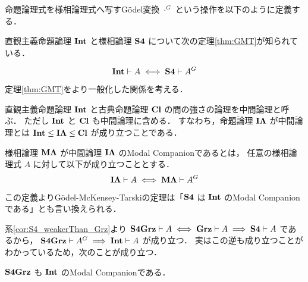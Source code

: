 \documentclass{jsarticle}
\begin{document}
\begin{definition}[Gödel変換]
	命題論理式を様相論理式へ写すGödel変換 $\cdot^G$ という操作を以下のように定義する．
\end{definition}

直観主義命題論理 $\mathbf{Int}$ と様相論理 $\mathbf{S4}$ について次の定理\ref{thm:GMT}が知られている．

\begin{theorem}\label{thm:GMT}
	\begin{equation*}
		\mathbf{Int} \vdash A \iff \mathbf{S4} \vdash A^G
	\end{equation*}
\end{theorem}

定理\ref{thm:GMT}をより一般化した関係を考える．

\begin{definition}[中間論理]
	直観主義命題論理 $\mathbf{Int}$ と古典命題論理 $\mathbf{Cl}$ の間の強さの論理を中間論理と呼ぶ．
	ただし $\mathbf{Int}$ と $\mathbf{Cl}$ も中間論理に含める．
	すなわち，命題論理 $\mathbf{I\Lambda}$ が中間論理とは $\mathbf{Int} \leq \mathbf{I\Lambda} \leq \mathbf{Cl}$ が成り立つことである．
\end{definition}

\begin{definition}
	様相論理 $\mathbf{M\Lambda}$ が中間論理 $\mathbf{I\Lambda}$ のModal Companionであるとは，
	任意の様相論理式 $A$ に対して以下が成り立つこととする．
	\begin{equation*}
		\mathbf{I\Lambda} \vdash A \iff \mathbf{M\Lambda} \vdash A^G
	\end{equation*}
\end{definition}

この定義よりGödel-McKensey-Tarskiの定理は「$\mathbf{S4}$ は $\mathbf{Int}$ のModal Companionである」とも言い換えられる．


系\ref{cor:S4_weakerThan_Grz}より $\mathbf{S4Grz} \vdash A \iff \mathbf{Grz} \vdash A \implies \mathbf{S4} \vdash A$ であるから，
$\mathbf{S4Grz} \vdash A^G \implies \mathbf{Int} \vdash A$ が成り立つ．
実はこの逆も成り立つことがわかっているため，次のことが成り立つ．

\begin{theorem}
	$\mathbf{S4Grz}$ も $\mathbf{Int}$ のModal Companionである．
\end{theorem}
\end{document}

